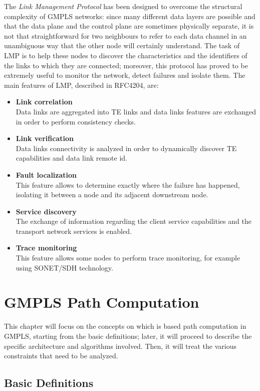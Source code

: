 \documentclass[10pt,a4paper]{report}
\begin{document}
The \textit{Link Management Protocol} has been designed to overcome
the structural complexity of GMPLS networks: since many different data
layers are possible and that the data plane and the control plane are
sometimes physically separate, it is not that straightforward for two
neighbours to refer to each data channel in an unambiguous way that
the other node will certainly understand. The task of LMP is to help
these nodes to discover the characteristics and the identifiers of the
links to which they are connected; moreover, this protocol has proved
to be extremely useful to monitor the network, detect failures and
isolate them. The main features of LMP, described in RFC4204, are:
\begin{itemize}
\item \textbf{Link correlation} \\
  Data links are aggregated into TE links and data links features are
  exchanged in order to perform consistency checks.
\item \textbf{Link verification} \\
  Data links connectivity is analyzed in order to dynamically discover
  TE capabilities and data link remote id.
\item \textbf{Fault localization} \\
  This feature allows to determine exactly where the failure has
  happened, isolating it between a node and its adjacent downstream
  node.
\item \textbf{Service discovery} \\
  The exchange of information regarding the client service
  capabilities and the transport network services is enabled.
\item \textbf{Trace monitoring} \\
  This feature allows some nodes to perform trace monitoring, for
  example using SONET/SDH technology.
\end{itemize}

\chapter{GMPLS Path Computation}\label{sec:gmplspath}

This chapter will focus on the concepts on which is based path
computation in GMPLS, starting from the basic definitions; later, it
will proceed to describe the specific architecture and algorithms
involved. Then, it will treat the various constraints that need to be
analyzed.

\section{Basic Definitions}
\end{document}

